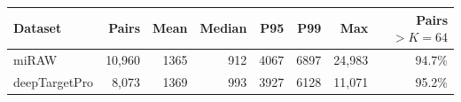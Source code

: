 \begin{tabular}{lrrrrrrr}
\toprule
Dataset & Pairs & Mean & Median & P95 & P99 & Max & Pairs $> K{=}64$ \\
\midrule
miRAW & 10,960 & 1365 & 912 & 4067 & 6897 & 24,983 & 94.7\% \\
deepTargetPro & 8,073 & 1369 & 993 & 3927 & 6128 & 11,071 & 95.2\% \\
\bottomrule
\end{tabular}
